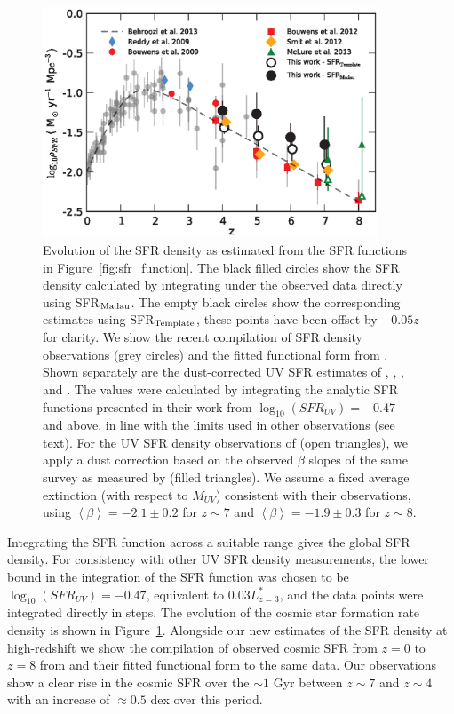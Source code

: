 \begin{figure}
\centering
\includegraphics[width=100mm]{plots/fig15.eps}
\caption{Evolution of the SFR density as estimated from the SFR functions in Figure~\ref{fig:sfr_function}. The black filled circles show the SFR density calculated by integrating under the observed data directly using SFR$_{\rm{Madau}}$. The empty black circles show the corresponding estimates using SFR$_{\rm{Template}}$, these points have been offset by $+0.05 z$ for clarity. We show the recent compilation of SFR density observations (grey circles) and the fitted functional form from \citet{Behroozi:2013fg}. Shown separately are the dust-corrected UV SFR estimates of \citet{Anonymous:r_woy2UF}, \citet{Bouwens:2009ik}, \citet{2012ApJ...754...83B},  \citet{Smit:2012is} and \citet{McLure:2013hh}. The \citet{Smit:2012is} values were calculated by integrating the analytic SFR functions presented in their work from $\log_{10}(SFR_{UV}) = -0.47$ and above, in line with the limits used in other observations (see text). For the UV SFR density observations of \citet{McLure:2013hh} (open triangles), we apply a dust correction based on the observed $\beta$ slopes of the same survey as measured by \citet{Dunlop:2013kp} (filled triangles). We assume a fixed average extinction (with respect to $M_{UV}$) consistent with their observations, using $\left \langle \beta \right \rangle = -2.1 \pm 0.2$ for $z \sim 7$ and $\left \langle \beta \right \rangle = -1.9 \pm 0.3$ for $z \sim 8$.}
\label{fig:sfr_density}
\end{figure}

Integrating the SFR function across a suitable range gives the global SFR density. For consistency with other UV SFR density measurements, the lower bound in the integration of the SFR function was chosen to be $\log_{10}(SFR_{UV}) = -0.47$, equivalent to $0.03 L^{*}_{z=3}$, and the data points were integrated directly in steps. The evolution of the cosmic star formation rate density is shown in Figure~\ref{fig:sfr_density}. Alongside our new estimates of the SFR density at high-redshift we show the compilation of observed cosmic SFR from $z=0$ to $z=8$ from \citet{Behroozi:2013fg} and their fitted functional form to the same data. Our observations show a clear rise in the cosmic SFR over the $\sim 1$ Gyr between $z\sim7$ and $z\sim4$ with an increase of $\approx 0.5$ dex over this period.

